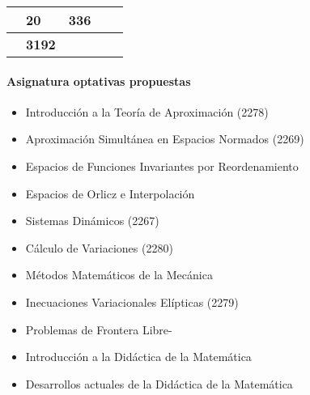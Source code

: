 \documentclass[a4paper, 12pt]{article}
\begin{document}
\begin{center}
\begin{xltabular}{1\textwidth}{|>{\raggedleft\arraybackslash}X |
>{\raggedleft\arraybackslash}X |
>{\raggedright\arraybackslash} p{5cm}|
>{\raggedleft\arraybackslash}X |
>{\raggedleft\arraybackslash}X |}
             & \textbf{20}          &\textbf{336}         \\ \hline
{}                               &\textbf{3192}         \\ \hline
\end{xltabular}
\end{center}
\normalsize


 
 
\paragraph{Asignatura  optativas propuestas} 

\begin{itemize}


\item {Introducción a la Teoría de Aproximación (2278)}
 



\item { Aproximación Simultánea en Espacios Normados (2269)}
 
 
\item {Espacios de Funciones Invariantes por Reordenamiento}
 


\item {Espacios de Orlicz e Interpolación} 
\ 

 
\item  {Sistemas Dinámicos (2267)}  

\item { Cálculo de Variaciones (2280)} 


\item { Métodos Matemáticos de la Mecánica} 


\item {Inecuaciones Variacionales Elípticas (2279)} 


 


\item {Problemas de Frontera Libre-}  



\item {Introducción a la Didáctica de la Matemática} 




\item {Desarrollos actuales de la Didáctica de la Matemática}  



\end{itemize}
\end{document}
